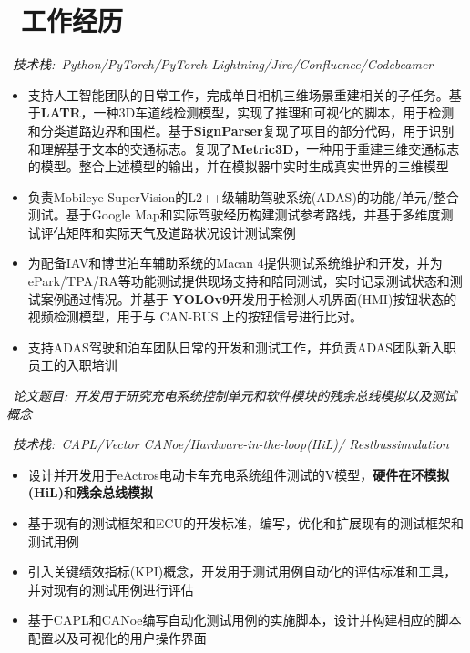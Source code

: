 \documentclass{resume}
\begin{document}
\section{\faUsers\ 工作经历}
\ \textit{技术栈:\ Python/PyTorch/PyTorch Lightning/Jira/Confluence/Codebeamer}
\begin{itemize}
  \item 支持人工智能团队的日常工作，完成单目相机三维场景重建相关的子任务。基于\textbf{LATR}，一种3D车道线检测模型，实现了推理和可视化的脚本，用于检测和分类道路边界和围栏。基于\textbf{SignParser}复现了项目的部分代码，用于识别和理解基于文本的交通标志。复现了\textbf{Metric3D}，一种用于重建三维交通标志的模型。整合上述模型的输出，并在模拟器中实时生成真实世界的三维模型
  \item 负责Mobileye SuperVision的L2++级辅助驾驶系统(ADAS)的功能/单元/整合测试。基于Google Map和实际驾驶经历构建测试参考路线，并基于多维度测试评估矩阵和实际天气及道路状况设计测试案例
  \item 为配备IAV和博世泊车辅助系统的Macan 4提供测试系统维护和开发，并为ePark/TPA/RA等功能测试提供现场支持和陪同测试，实时记录测试状态和测试案例通过情况。并基于 \textbf{YOLOv9}开发用于检测人机界面(HMI)按钮状态的视频检测模型，用于与 CAN-BUS 上的按钮信号进行比对。
  \item 支持ADAS驾驶和泊车团队日常的开发和测试工作，并负责ADAS团队新入职员工的入职培训
\end{itemize}
\vspace{0.1cm}

\ \textit{论文题目:\ 开发用于研究充电系统控制单元和软件模块的残余总线模拟以及测试概念}

\ \textit{技术栈:\ CAPL/Vector CANoe/Hardware-in-the-loop(HiL)/
Restbussimulation}
\begin{itemize}
  \item 设计并开发用于eActros电动卡车充电系统组件测试的V模型，\textbf{硬件在环模拟(HiL)}和\textbf{残余总线模拟}
  \item 基于现有的测试框架和ECU的开发标准，编写，优化和扩展现有的测试框架和测试用例
  \item 引入关键绩效指标(KPI)概念，开发用于测试用例自动化的评估标准和工具，并对现有的测试用例进行评估
  \item 基于CAPL和CANoe编写自动化测试用例的实施脚本，设计并构建相应的脚本配置以及可视化的用户操作界面
\end{itemize}
\vspace{0.1cm}
\end{document}
